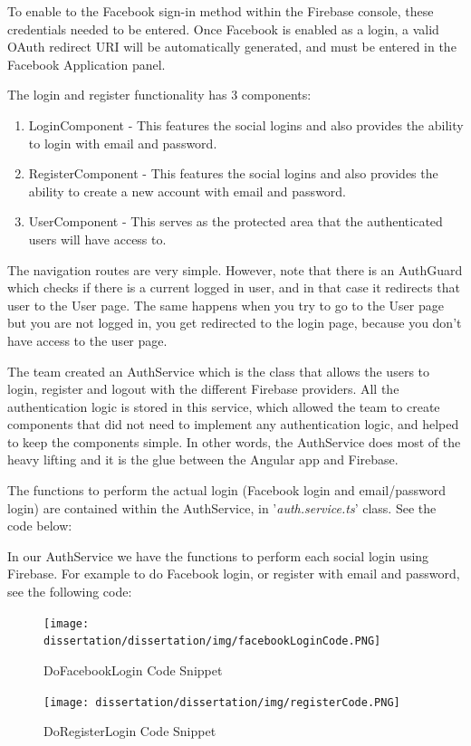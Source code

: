 To enable to the Facebook sign-in method within the Firebase console, these credentials needed to be entered. Once Facebook is enabled as a login, a valid OAuth redirect URI will be automatically generated, and must be entered in the Facebook Application panel.

\bigskip

The login and register functionality has 3 components:

\begin{enumerate}
    \item LoginComponent - This features the social logins and also provides the ability to login with email and password.
    \item RegisterComponent - This features the social logins and also provides the ability to create a new account with email and password.
    \item UserComponent - This serves as the protected area that the authenticated users will have access to.
\end{enumerate}

The navigation routes are very simple. However, note that there is an AuthGuard which checks if there is a current logged in user, and in that case it redirects that user to the User page. The same happens when you try to go to the User page but you are not logged in, you get redirected to the login page, because you don’t have access to the user page.

The team created an AuthService which is the class that allows the users to login, register and logout with the different Firebase providers. All the authentication logic is stored in this service, which allowed the team to create components that did not need to implement any authentication logic, and helped to keep the components simple. In other words, the AuthService does most of the heavy lifting and it is the glue between the Angular app and Firebase.

\bigskip

The functions to perform the actual login (Facebook login and email/password login) are contained within the AuthService, in '\textit{auth.service.ts}' class. See the code below:


In our AuthService we have the functions to perform each social login using Firebase. For example to do Facebook login, or register with email and password, see the following code: 




\begin{figure}[!tbp]
  \centering
  \begin{minipage}[b]{0.48\textwidth}
    \texttt{[image: dissertation/dissertation/img/facebookLoginCode.PNG]}
    \caption{DoFacebookLogin Code Snippet}
  \end{minipage}
  \hfill
  \begin{minipage}[b]{0.48\textwidth}
    \texttt{[image: dissertation/dissertation/img/registerCode.PNG]}
    \caption{DoRegisterLogin Code Snippet}
  \end{minipage}
\end{figure}

